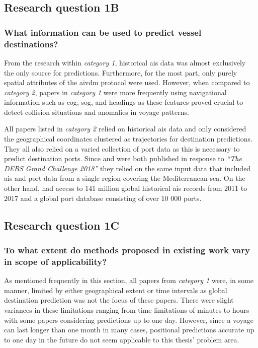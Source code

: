 \subsection{Research question 1B}
\subsubsection{What information can be used to predict vessel destinations?}

From the research within \textit{category 1}, historical \acrshort{ais} data was almost exclusively the only source for predictions. Furthermore, for the most part, only purely spatial attributes of the \gls{aivdm} protocol were used. However, when compared to \textit{category 2}, papers in \textit{category 1} were more frequently using navigational information such as \acrshort{cog}, \acrshort{sog}, and headings as these features proved crucial to detect collision situations and anomalies in voyage patterns.

All papers listed in \textit{category 2} relied on historical \acrshort{ais} data and only considered the geographical coordinates clustered as trajectories for destination predictions. They all also relied on a varied collection of port data as this is necessary to predict destination ports. Since \cite{Rosca2018GrandRoutes} and \cite{Bachar2018GrandDestination} were both published in response to \textit{``The DEBS Grand Challenge 2018''} they relied on the same input data that included \acrshort{ais} and port data from a single region covering the Mediterranean sea. On the other hand, \cite{Zhang2020AISApproach} had access to 141 million global historical \acrshort{ais} records from 2011 to 2017 and a global port database consisting of over 10 000 ports.

\subsection{Research question 1C}
\subsubsection{To what extent do methods proposed in existing work vary in scope of applicability?}

As mentioned frequently in this section, all papers from \textit{category 1} were, in some manner, limited by either geographical extent or time intervals as global destination prediction was not the focus of these papers. There were slight variances in these limitations ranging from time limitations of minutes to hours with some papers considering predictions up to one day. However, since a voyage can last longer than one month in many cases, positional predictions accurate up to one day in the future do not seem applicable to this thesis' problem area.

